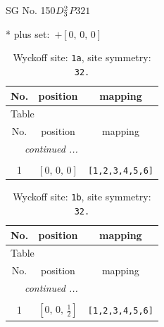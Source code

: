 \documentclass[fleqn,8pt]{jsarticle}
\begin{document}
\setcounter{MaxMatrixCols}{32}

\renewcommand{\tablename}{Table~}
\renewcommand{\figurename}{Figure~}
\begin{center}
\LARGE
SG No. 150\quad$D_{\rm 3}^{2}$\quad$P321$\quad[ trigonal ]
\end{center}
* plus set:\,\,\,$+\left[ 0,\, 0,\, 0 \right]$
\renewcommand{\arraystretch}{1.2}
\begin{longtable}{ccc}
\caption{Wyckoff site: {\tt 1a}, site symmetry: {\tt 32.}}
 \\
 \hline \hline
No. & position & mapping \\ \hline \endfirsthead

\multicolumn{2}{l}{\tablename\ \thetable{}} \\
 \hline \hline
No. & position & mapping \\ \hline \endhead

 \hline \hline
\multicolumn{2}{r}{\footnotesize\it continued ...} \\ \endfoot

 \hline \hline
\multicolumn{2}{r}{} \\ \endlastfoot

1 & $\left[ 0,\, 0,\, 0 \right]$ & {\tt [1,2,3,4,5,6]} \\
\end{longtable}
\renewcommand{\arraystretch}{1.2}
\begin{longtable}{ccc}
\caption{Wyckoff site: {\tt 1b}, site symmetry: {\tt 32.}}
 \\
 \hline \hline
No. & position & mapping \\ \hline \endfirsthead

\multicolumn{2}{l}{\tablename\ \thetable{}} \\
 \hline \hline
No. & position & mapping \\ \hline \endhead

 \hline \hline
\multicolumn{2}{r}{\footnotesize\it continued ...} \\ \endfoot

 \hline \hline
\multicolumn{2}{r}{} \\ \endlastfoot

1 & $\left[ 0,\, 0,\, \frac{1}{2} \right]$ & {\tt [1,2,3,4,5,6]} \\
\end{longtable}
\renewcommand{\arraystretch}{1.2}
\end{document}
